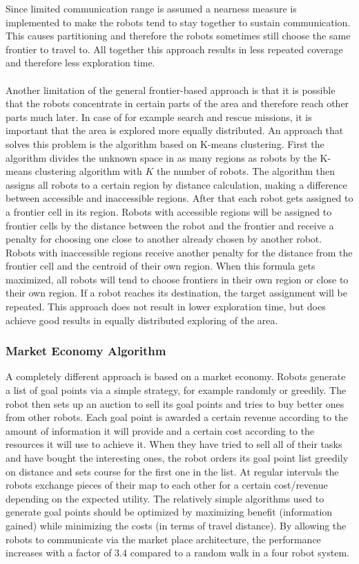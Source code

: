 	Since limited communication range is assumed a nearness measure is implemented to make the robots tend to stay together to sustain communication.
	This causes partitioning and therefore the robots sometimes still choose the same frontier to travel to.
	All together this approach results in less repeated coverage and therefore less exploration time. \cite{sheng2006distributed}\\
	\\
	Another limitation of the general frontier-based approach is that it is possible that the robots concentrate in certain parts of the area and therefore reach other parts much later.
	In case of for example search and rescue missions, it is important that the area is explored more equally distributed. 
	An approach that solves this problem is the algorithm based on K-means clustering.
	First the algorithm divides the unknown space in as many regions as robots by the K-means clustering algorithm with $K$ the number of robots.
	The algorithm then assigns all robots to a certain region by distance calculation, making a difference between accessible and inaccessible regions.
	After that each robot gets assigned to a frontier cell in its region.
	Robots with accessible regions will be assigned to frontier cells by the distance between the robot and the frontier and receive a penalty for choosing one close to another already chosen by another robot.
	Robots with inaccessible regions receive another penalty for the distance from the frontier cell and the centroid of their own region.
	When this formula gets maximized, all robots will tend to choose frontiers in their own region or close to their own region.
	If a robot reaches its destination, the target assignment will be repeated.
	This approach does not result in lower exploration time, but does achieve good results in equally distributed exploring of the area. \cite{solanas2004coordinated}

	\subsubsection{Market Economy Algorithm}
	A completely different approach is based on a market economy.
	Robots generate a list of goal points via a simple strategy, for example randomly or greedily.
	The robot then sets up an auction to sell its goal points and tries to buy better ones from other robots.
	Each goal point is awarded a certain revenue according to the amount of information it will provide and a certain cost according to the resources it will use to achieve it.
	When they have tried to sell all of their tasks and have bought the interesting ones, the robot orders its goal point list greedily on distance and sets course for the first one in the list.
	At regular intervals the robots exchange pieces of their map to each other for a certain cost/revenue depending on the expected utility.
	The relatively simple algorithms used to generate goal points should be optimized by maximizing benefit (information gained) while minimizing the costs (in terms of travel distance).
	By allowing the robots to communicate via the market place architecture, the performance increases with a factor of $3.4$ compared to a random walk in a four robot system. \cite{zlot2002multi}

